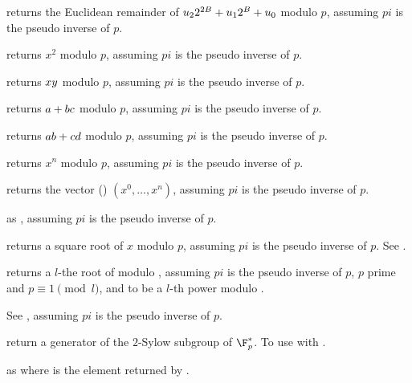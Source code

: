 returns the Euclidean remainder of $u_2\*2^{2\*B}+u_1\*2^{B}+u_0$ modulo $p$,
assuming $pi$ is the pseudo inverse of $p$.

 returns $x^2$ modulo $p$,
assuming $pi$ is the pseudo inverse of $p$.

 returns $x\*y$
modulo $p$, assuming $pi$ is the pseudo inverse of $p$.

returns $a+b\*c$ modulo $p$, assuming $pi$ is the pseudo inverse of $p$.

returns $a\*b+c\*d$ modulo $p$, assuming $pi$ is the pseudo inverse of $p$.

 returns
$x^n$ modulo $p$, assuming $pi$ is the pseudo inverse of $p$.

 returns
the vector () $(x^0, \dots, x^n)$, assuming $pi$ is
the pseudo inverse of $p$.

as , assuming $pi$ is the pseudo inverse of $p$.

 returns a square root
of $x$ modulo $p$, assuming $pi$ is the pseudo inverse of $p$.
See .

returns a $l$-the root of 
modulo , assuming $pi$ is the pseudo inverse of $p$,
$p$ prime and $p \equiv 1 \pmod{l}$, and  to be a $l$-th power modulo
.

See , assuming $pi$ is the pseudo inverse of $p$.

 return a generator of
the $2$-Sylow subgroup of $\F_p^*$. To use with .

as  where  is the element returned by
.


